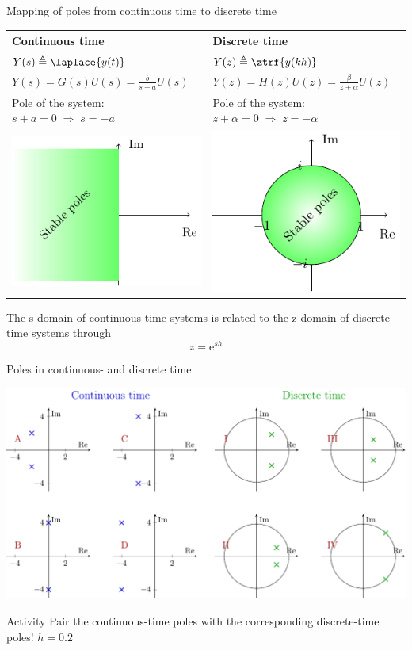 \documentclass[presentation,aspectratio=169]{beamer}
\begin{document}
\begin{frame}[label={sec:org23ff790}]{Mapping of poles from continuous time to discrete time}
\begin{center}
\begin{tabular}{ll}
Continuous time & Discrete time\\
\hline
\(Y(s) \triangleq \laplace{y(t)}\) & \(Y(z) \triangleq \ztrf{y(kh)}\)\\
\(Y(s) = G(s)U(s) = \frac{b}{s+a}U(s)\) & \(Y(z) = H(z)U(z) = \frac{\beta}{z+\alpha}U(z)\)\\
Pole of the system: \(s+a=0 \; \Rightarrow \; s = -a\) & Pole of the system: \(z+\alpha = 0 \; \Rightarrow \; z = -\alpha\)\\
\includegraphics[width=0.22\linewidth]{../../figures/cont-stable} & \includegraphics[width=0.22\linewidth]{../../figures/discrete-stable}\\
\hline
\end{tabular}
\end{center}

The \alert{s-domain} of continuous-time systems is related to the \alert{z-domain} of discrete-time systems through  \[z = \mathrm{e}^{sh}\]
\end{frame}

\begin{frame}[label={sec:orgda35d5b}]{Poles in continuous- and discrete time}
\begin{center}
\includegraphics[width=0.85\linewidth]{../../figures/pzmap-continuous-discrete-exc}
\end{center}

\alert{Activity} Pair the continuous-time poles with the corresponding discrete-time poles! \(h=0.2\)
\end{frame}
\end{document}
